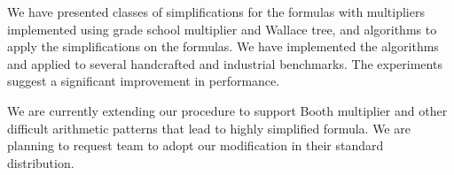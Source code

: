 We have presented classes of simplifications for the formulas with
multipliers implemented using grade school multiplier and Wallace tree,
and algorithms to apply the simplifications on the formulas.
%
We have implemented the algorithms and applied to several handcrafted and 
industrial benchmarks.
%
The experiments suggest a significant improvement in performance.

We are currently extending our procedure to support Booth multiplier
and other difficult arithmetic patterns that lead to highly simplified
formula.
%
We are planning to request \zthree team to adopt our modification in their
standard distribution.



